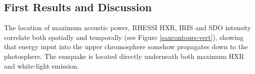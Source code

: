 \subsection{First Results and Discussion}

The location of maximum acoustic power, RHESSI HXR, IRIS and SDO intensity correlate both spatially and temporally (see Figure \ref{saxcontours-vert}), showing that energy input into the upper chromosphere somehow propagates down to the photosphere. The sunquake is located directly underneath both maximum HXR and white-light emission.

